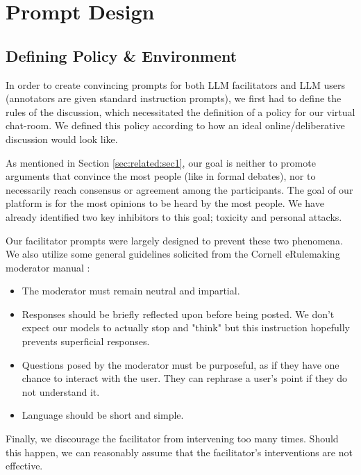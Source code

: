 \section{Prompt Design}
\label{sec:system:design-prompt}

\subsection{Defining Policy \& Environment}

In order to create convincing prompts for both LLM facilitators and  LLM users (annotators are given standard instruction prompts), we first had to define the rules of the discussion, which necessitated the definition of a policy for our virtual chat-room. We defined this policy according to how an ideal online/deliberative discussion would look like.

As mentioned in Section \ref{sec:related:sec1}, our goal is neither to promote arguments that convince the most people (like in formal debates), nor to necessarily reach consensus or agreement among the participants. The goal of our platform is for the most opinions to be heard by the most people. We have already identified two key inhibitors to this goal; toxicity and personal attacks.

Our facilitator prompts were largely designed to prevent these two phenomena. We also utilize some general guidelines solicited from the Cornell eRulemaking moderator manual \cite{Cornell_eRulemaking2017}:

\begin{itemize}
	\item The moderator must remain neutral and impartial. 
	
	\item Responses should be briefly reflected upon before being posted. We don't expect our models to actually stop and "think" but this instruction hopefully prevents superficial responses.
	
	\item Questions posed by the moderator must be purposeful, as if they have one chance to interact with the user. They can rephrase a user's point if they do not understand it.
	
	\item Language should be short and simple.
\end{itemize}

Finally, we discourage the facilitator from intervening too many times. Should this happen, we can reasonably assume that the facilitator's interventions are not effective.

